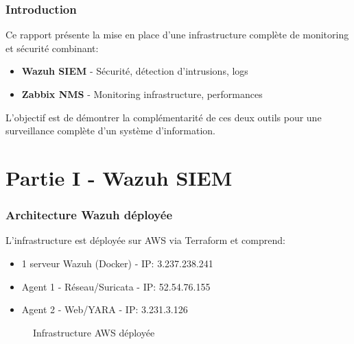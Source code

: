 \documentclass[12pt,a4paper]{article}
\begin{document}
\newpage

\section{Introduction}

Ce rapport présente la mise en place d'une infrastructure complète de monitoring et sécurité combinant:
\begin{itemize}
    \item \textbf{Wazuh SIEM} - Sécurité, détection d'intrusions, logs
    \item \textbf{Zabbix NMS} - Monitoring infrastructure, performances
\end{itemize}

L'objectif est de démontrer la complémentarité de ces deux outils pour une surveillance complète d'un système d'information.

\part{Partie I - Wazuh SIEM}

\section{Architecture Wazuh déployée}

L'infrastructure est déployée sur AWS via Terraform et comprend:
\begin{itemize}
    \item 1 serveur Wazuh (Docker) - IP: 3.237.238.241
    \item Agent 1 - Réseau/Suricata - IP: 52.54.76.155
    \item Agent 2 - Web/YARA - IP: 3.231.3.126
\end{itemize}

\begin{figure}[H]
    \centering
    \caption{Infrastructure AWS déployée}
    \label{fig:aws-instances}
\end{figure}
\end{document}
